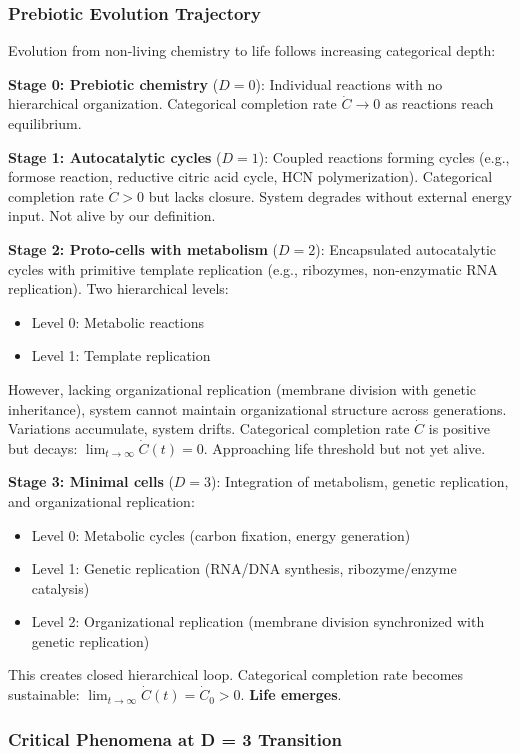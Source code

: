 \documentclass[11pt]{article}
\begin{document}
\subsubsection{Prebiotic Evolution Trajectory}

Evolution from non-living chemistry to life follows increasing categorical depth:

\textbf{Stage 0: Prebiotic chemistry} ($D = 0$): Individual reactions with no hierarchical organization. Categorical completion rate $\dot{C} \to 0$ as reactions reach equilibrium.

\textbf{Stage 1: Autocatalytic cycles} ($D = 1$): Coupled reactions forming cycles (e.g., formose reaction, reductive citric acid cycle, HCN polymerization). Categorical completion rate $\dot{C} > 0$ but lacks closure. System degrades without external energy input. Not alive by our definition.

\textbf{Stage 2: Proto-cells with metabolism} ($D = 2$): Encapsulated autocatalytic cycles with primitive template replication (e.g., ribozymes, non-enzymatic RNA replication). Two hierarchical levels:
\begin{itemize}
\item Level 0: Metabolic reactions
\item Level 1: Template replication
\end{itemize}
However, lacking organizational replication (membrane division with genetic inheritance), system cannot maintain organizational structure across generations. Variations accumulate, system drifts. Categorical completion rate $\dot{C}$ is positive but decays: $\lim_{t \to \infty} \dot{C}(t) = 0$. Approaching life threshold but not yet alive.

\textbf{Stage 3: Minimal cells} ($D = 3$): Integration of metabolism, genetic replication, and organizational replication:
\begin{itemize}
\item Level 0: Metabolic cycles (carbon fixation, energy generation)
\item Level 1: Genetic replication (RNA/DNA synthesis, ribozyme/enzyme catalysis)
\item Level 2: Organizational replication (membrane division synchronized with genetic replication)
\end{itemize}
This creates closed hierarchical loop. Categorical completion rate becomes sustainable: $\lim_{t \to \infty} \dot{C}(t) = \dot{C}_0 > 0$. \textbf{Life emerges}.

\subsubsection{Critical Phenomena at D = 3 Transition}
\end{document}
